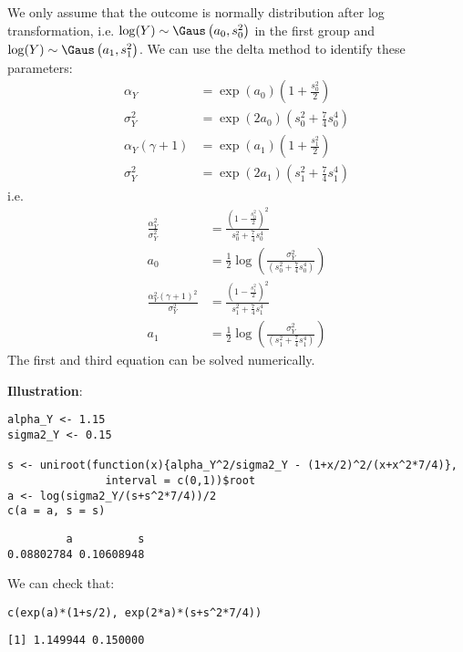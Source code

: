 \documentclass[12pt]{article}
\begin{document}
We only assume that the outcome is normally distribution after log
transformation, i.e. \(\log(Y) \sim
\Gaus\left(a_0,s^2_0\right)\) in the first group
and \(\log(Y) \sim
\Gaus\left(a_1,s^2_1\right)\). We can use the
delta method to identify these parameters:
\begin{align*}
\alpha_Y &= \exp(a_0)\left(1 + \frac{s^2_0}{2}\right) \\
\sigma^2_Y &= \exp(2 a_0)\left(s^2_0 + \frac{7}{4}s^4_0\right) \\
\alpha_Y (\gamma+1) &= \exp(a_1)\left(1 + \frac{s^2_1}{2}\right) \\
\sigma^2_Y &= \exp(2 a_1)\left(s^2_1 + \frac{7}{4}s^4_1\right)
\end{align*}
i.e.
\begin{align*}
\frac{\alpha^2_Y}{\sigma_Y^2} &= \frac{\left(1-\frac{s_0^2}{2}\right)^2}{s^2_0 + \frac{7}{4}s^4_0}  \\
a_0 &= \frac{1}{2}\log\left(\frac{\sigma^2_Y}{\left(s^2_0 + \frac{7}{4}s^4_0\right)}\right) \\
\frac{\alpha^2_Y(\gamma+1)^2}{\sigma_Y^2} &= \frac{\left(1-\frac{s_1^2}{2}\right)^2}{s^2_1 + \frac{7}{4}s^4_1}  \\
a_1 &= \frac{1}{2}\log\left(\frac{\sigma^2_Y}{\left(s^2_1 + \frac{7}{4}s^4_1\right)}\right) 
\end{align*}
The first and third equation can be solved numerically.

\bigskip

\textbf{Illustration}:
\lstset{language=r,label= ,caption= ,captionpos=b,numbers=none}
\begin{lstlisting}
alpha_Y <- 1.15
sigma2_Y <- 0.15

s <- uniroot(function(x){alpha_Y^2/sigma2_Y - (1+x/2)^2/(x+x^2*7/4)},
			   interval = c(0,1))$root
a <- log(sigma2_Y/(s+s^2*7/4))/2
c(a = a, s = s)
\end{lstlisting}

\begin{verbatim}
         a          s 
0.08802784 0.10608948
\end{verbatim}



We can check that:
\lstset{language=r,label= ,caption= ,captionpos=b,numbers=none}
\begin{lstlisting}
c(exp(a)*(1+s/2), exp(2*a)*(s+s^2*7/4))
\end{lstlisting}

\begin{verbatim}
[1] 1.149944 0.150000
\end{verbatim}
\end{document}
